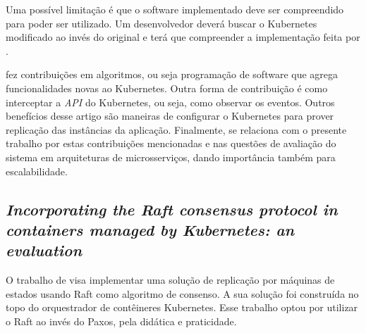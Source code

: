

Uma possível limitação é que o software implementado deve ser compreendido para poder ser utilizado. Um desenvolvedor deverá buscar o Kubernetes modificado ao invés do original e terá que compreender a implementação feita por \textcite{vayghan2021kubernetes}.


\textcite{vayghan2021kubernetes} fez contribuições em algoritmos, ou seja programação de software que agrega funcionalidades novas ao Kubernetes. Outra forma de contribuição é como interceptar a \textit{API} do Kubernetes, ou seja, como observar os eventos. Outros benefícios desse artigo são maneiras de configurar o Kubernetes para prover replicação das instâncias da aplicação. Finalmente, se relaciona com o presente trabalho por estas contribuições mencionadas e nas questões de avaliação do sistema em arquiteturas de microsserviços, dando importância também para escalabilidade.



\subsection{\textit{Incorporating the Raft consensus protocol in containers managed by Kubernetes: an evaluation}}

O trabalho de \textcite{netto2020incorporating} visa implementar uma solução de replicação por máquinas de estados usando Raft como algoritmo de consenso. A sua solução foi construída no topo do orquestrador de contêineres Kubernetes. Esse trabalho optou por utilizar o Raft ao invés do Paxos, pela didática e praticidade.

